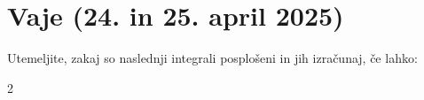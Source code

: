 \documentclass[11pt,a4paper]{exam}
\renewcommand{\{}{\lbrace}
\renewcommand{\}}{\rbrace}
\begin{document}
\section*{Vaje (24. in 25. april 2025)}
\begin{questions}
	\question Utemeljite, zakaj so naslednji integrali posplošeni in jih izračunaj, če lahko:
	\begin{multicols}{2}
	\end{multicols}


\end{questions}
\end{document}
